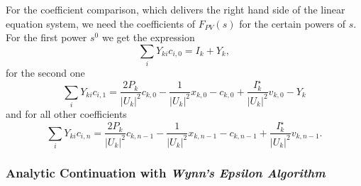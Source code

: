 For the coefficient comparison, which delivers the right hand side of the linear equation system, we need the coefficients of $F_{PV}(s)$ for the certain powers of $s$. For the first power $s^0$ we get the expression
\begin{equation}
	\sum_i Y_{ki} c_{i,0} = I_k + Y_k,
\end{equation}
for the second one
\begin{equation}
	\sum_i Y_{ki} c_{i,1} = \frac{2 P_k}{|U_k|^2} c_{k,0} - \frac{1}{|U_k|^2} x_{k,0} - c_{k,0} + \frac{I_k^\star}{|U_k|^2} v_{k,0} - Y_k
\end{equation}
and for all other coefficients
\begin{equation}
	\sum_i Y_{ki} c_{i,n} = \frac{2 P_k}{|U_k|^2} c_{k,n-1} - \frac{1}{|U_k|^2} x_{k,n-1} - c_{k,n-1} + \frac{I_k^\star}{|U_k|^2} v_{k,n-1}.
\end{equation}

\subsubsection{Analytic Continuation with \emph{Wynn's Epsilon Algorithm}}


